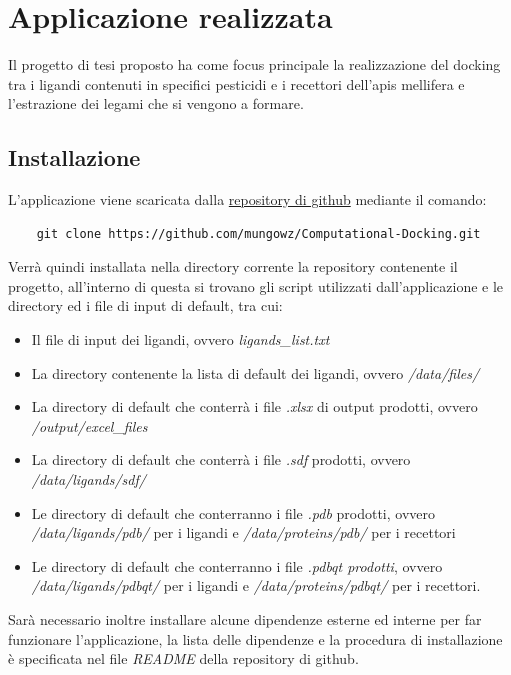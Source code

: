 \chapter{Applicazione realizzata}
Il progetto di tesi proposto ha come focus principale la realizzazione del docking tra i ligandi contenuti in specifici pesticidi e i recettori dell'apis mellifera e l'estrazione dei legami che si vengono a formare. 

\section{Installazione}
L'applicazione viene scaricata dalla \href{https://github.com/mungowz/Computational-Docking/tree/development}{repository di github} mediante il comando:

\begin{verbatim}
    git clone https://github.com/mungowz/Computational-Docking.git    
\end{verbatim}

Verrà quindi installata nella directory corrente la repository contenente il progetto, all'interno di questa si trovano gli script utilizzati dall'applicazione e le directory ed i file di input di default, tra cui:

\begin{itemize}
    \item Il file di input dei ligandi, ovvero \textit{ligands\_list.txt}
    \item La directory contenente la lista di default dei ligandi, ovvero \textit{/data/files/}
    \item La directory di default che conterrà i file \textit{.xlsx} di output prodotti, ovvero \textit{/output/excel\_files}
    \item La directory di default che conterrà i file \textit{.sdf} prodotti, ovvero \textit{/data/ligands/sdf/}
    \item Le directory di default che conterranno i file \textit{.pdb} prodotti, ovvero \textit{/data/ligands/pdb/} per i ligandi e \textit{/data/proteins/pdb/} per i recettori
    \item Le directory di default che conterranno i file \textit{.pdbqt prodotti}, ovvero \textit{/data/ligands/pdbqt/} per i ligandi e \textit{/data/proteins/pdbqt/} per i recettori.
\end{itemize}

Sarà necessario inoltre installare alcune dipendenze esterne ed interne per far funzionare l'applicazione, la lista delle dipendenze e la procedura di installazione è specificata nel file \textit{README} della repository di github.

